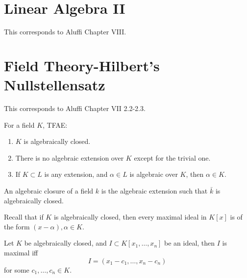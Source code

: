 \documentclass[openany]{book}
\begin{document}
\chapter{Linear Algebra II}
This corresponds to Aluffi Chapter VIII.

\chapter{Field Theory-Hilbert's Nullstellensatz}
This corresponds to Aluffi Chapter VII 2.2-2.3.


\begin{prop}
    For a field $K$, TFAE:
    \begin{enumerate}
        \item $K$ is algebraically closed.
        \item There is no algebraic extension over $K$ except for the trivial one.
        \item If $K\subset L$ is any extension, and $\alpha\in L$ is algebraic over $K$, then $\alpha\in K$.
    \end{enumerate}
\end{prop}

\begin{defn}
    An algebraic closure of a field $k$ is the algebraic extension such that $\bar{k}$ is algebraically closed.
\end{defn}

\begin{prop}
    Recall that if $K$ is algebraically closed, then every maximal ideal in $K[x]$ is of the form $(x-\alpha),\alpha\in K$.
\end{prop}
\begin{prop}
    Let $K$ be algebraically closed, and $I\subset K[x_1,\dots,x_n]$ be an ideal, then $I$ is maximal iff 
    \begin{equation*}
        I=(x_1-c_1,\dots, x_n-c_n)
    \end{equation*}
    for some $c_1,\dots,c_n\in K$.
\end{prop}

\end{document}
